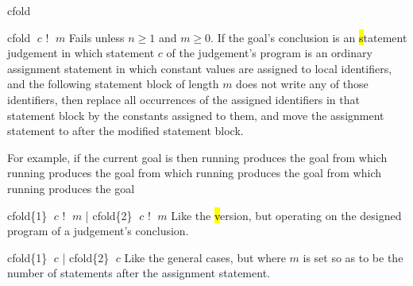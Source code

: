\begin{tactic}{cfold}
  \begin{tsyntax}{cfold $\;c$ ! $\;m$}
    Fails unless $n\geq 1$ and $m\geq 0$.  If the goal's conclusion is
    an \hl statement judgement in which statement $c$ of the
    judgement's program is an ordinary assignment statement in which
    constant values are assigned to local identifiers, and the
    following statement block of length $m$ does not write any of
    those identifiers, then replace all occurrences of the assigned
    identifiers in that statement block by the constants assigned to
    them, and move the assignment statement to after the modified
    statement block.

    \medskip For example, if the current goal is
     then
    running 
    produces the goal
    from which
    running 
    produces the goal
    from which
    running 
    produces the goal
    from which
    running 
    produces the goal
  \end{tsyntax}

  \begin{tsyntax}{cfold\{1\} $\;c$ ! $\;m$ | cfold\{2\} $\;c$ ! $\;m$}
    Like the \hl version, but operating on the designed program of
    a \prhl judgement's conclusion.
  \end{tsyntax}

  \begin{tsyntax}{cfold\{1\} $\;c$ | cfold\{2\} $\;c$}
    Like the general cases, but where $m$ is set so as to be the
    number of statements after the assignment statement.
  \end{tsyntax}
\end{tactic}
